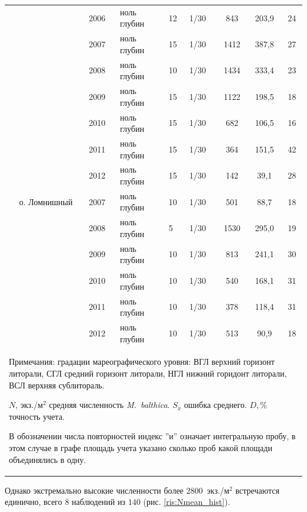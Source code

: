 \documentclass[12pt, a4paper]{disser}
\begin{document}
\begin{footnotesize}
\begin{longtable}{|p{2cm}|p{3cm}|p{1cm}|p{2cm}|p{1.5cm}|p{1cm}|*{3}{c|}}
		 &  & 2006 & ноль глубин & 12 & 1/30 & 843 & 203,9 & 24
		\\ \cline{3-9}
		 &  & 2007 & ноль глубин & 15 & 1/30 & 1412 & 387,8 & 27
		\\ \cline{3-9}
		 &  & 2008 & ноль глубин & 10 & 1/30 & 1434 & 333,4 & 23
		\\ \cline{3-9}
		 &  & 2009 & ноль глубин & 15 & 1/30 & 1122 & 198,5 & 18
		\\ \cline{3-9}
		 &  & 2010 & ноль глубин & 15 & 1/30 & 682 & 106,5 & 16
		\\ \cline{3-9}
		 &  & 2011 & ноль глубин & 15 & 1/30 & 364 & 151,5 & 42
		\\ \cline{3-9}
		 &  & 2012 & ноль глубин & 15 & 1/30 & 142 & 39,1 & 28
		\\ \cline{2-9}
	 & о. Ломнишный & 2007 & ноль глубин & 10 & 1/30 & 501 & 88,7 & 18
		\\ \cline{3-9}
		 &  & 2008 & ноль глубин & 5 & 1/30 & 1530 & 295,0 & 19
		\\ \cline{3-9}
		 &  & 2009 & ноль глубин & 10 & 1/30 & 813 & 241,1 & 30
	\\ \cline{3-9}
	 &  & 2010 & ноль глубин & 10 & 1/30 & 540 & 168,1 & 31
	\\ \cline{3-9}
	 &  & 2011 & ноль глубин & 10 & 1/30 & 378 & 118,4 & 31
	\\ \cline{3-9}
	 &  & 2012 & ноль глубин & 10 & 1/30 & 513 & 90,9 & 18
	\\ \hline
	\multicolumn{9}{p{16cm}}{Примечания: градации мареографического уровня: ВГЛ \textemdash верхний горизонт литорали, СГЛ \textemdash средний горизонт литорали, НГЛ \textemdash нижний горидонт литорали, ВСЛ \textemdash верхняя сублитораль. 

	$N$, экз./м$^2$ \textemdash средняя численность {\it M.~balthica}. 
	$S_x$ \textemdash ошибка среднего.
	 $D, \%$ \textemdash  точность учета.

	В обозначении числа повторностей индекс ''и'' означает интегральную пробу, в этом случае в графе площадь учета указано сколько проб какой площади объединялись в одну.}
	\end{longtable}
	\end{footnotesize}
%
Однако экстремально высокие численности \textemdash более $2800$~экз./м$^2$ \textemdash встречаются единично, всего $8$ наблюдений из $140$ (рис. \ref{ris:Nmean_hist}).
%
\end{document}
